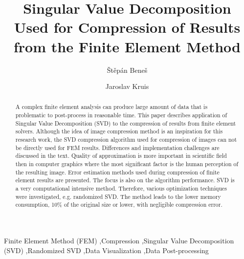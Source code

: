 \documentclass[preprint,12pt]{elsarticle}
\begin{document}
\begin{frontmatter}


\title{Singular Value Decomposition Used for Compression of Results from the Finite Element Method}

\author{\v{S}t\v{e}p\'{a}n Bene\v{s}} %
\author{Jaroslav Kruis}

\address{Department of Mechanics, Faculty of Civil Engineering, Czech Technical University in Prague Th\'akurova 7, Prague 166 29, Czech Republic}

\begin{abstract}
A complex finite element analysis can produce large amount of data that is problematic to post-process in reasonable time. This paper describes application of Singular Value Decomposition (SVD) to the compression of results from finite element solvers. Although the idea of image compression method is an inspiration for this research work, the SVD compression algorithm used for compression of images can not be directly used for FEM results. Differences and implementation challenges are discussed in the text. Quality of approximation is more important in scientific field then in computer graphics where the most significant factor is the human perception of the resulting image. Error estimation methods used during compression of finite element results are presented. The focus is also on the algorithm performance. SVD is a very computational intensive method. Therefore, various optimization techniques were investigated, e.g. randomized SVD. The method leads to the lower memory consumption, 10\% of the original size or lower, with negligible compression error.
\end{abstract}

\begin{keyword}
Finite Element Method (FEM) \sep Compression \sep Singular Value Decomposition (SVD) \sep Randomized SVD \sep Data Visualization \sep Data Post-processing
\end{keyword}

\end{frontmatter}

\end{document}
